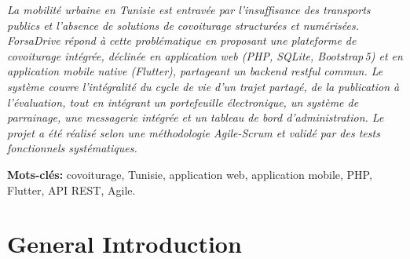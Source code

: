 \documentclass[12pt,a4paper,openright]{report}
\begin{document}
\vspace{0.3cm}
\noindent\textit{La mobilité urbaine en Tunisie est entravée par l'insuffisance des transports publics et l'absence de solutions de covoiturage structurées et numérisées. ForsaDrive répond à cette problématique en proposant une plateforme de covoiturage intégrée, déclinée en application web (PHP, SQLite, Bootstrap\,5) et en application mobile native (Flutter), partageant un backend \gls{rest}ful commun. Le système couvre l'intégralité du cycle de vie d'un trajet partagé, de la publication à l'évaluation, tout en intégrant un portefeuille électronique, un système de parrainage, une messagerie intégrée et un tableau de bord d'administration. Le projet a été réalisé selon une méthodologie Agile-Scrum et validé par des tests fonctionnels systématiques.}

\vspace{0.4cm}
\noindent\textbf{Mots-clés:} covoiturage, Tunisie, application web, application mobile, PHP, Flutter, API REST, Agile.

\cleardoublepage
\tableofcontents

\cleardoublepage
\listoffigures
{}

\cleardoublepage
\listoftables
{}

\cleardoublepage
\printglossary[type=\acronymtype, title=List of Acronyms, toctitle=List of Acronyms]

\cleardoublepage
{}
\setcounter{page}{1}

\chapter{General Introduction}
\end{document}
